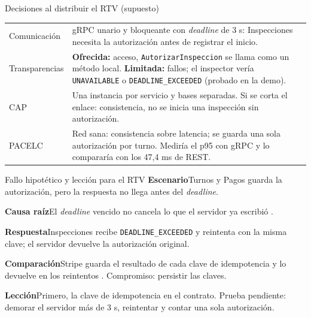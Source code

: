 \begin{frame}{Decisiones al distribuir el RTV (supuesto)}\relax
\small
\begin{tabularx}{\linewidth}{@{}lX@{}}
\toprule
Comunicación & gRPC unario y bloqueante con \emph{deadline} de 3 s: Inspecciones necesita la autorización antes de registrar el inicio.\\
Transparencias & \textbf{Ofrecida:} acceso, \texttt{AutorizarInspeccion} se llama como un método local. \textbf{Limitada:} fallos; el inspector vería \texttt{UNAVAILABLE} o \texttt{DEADLINE\_EXCEEDED} (probado en la demo).\\
CAP & Una instancia por servicio y bases separadas. Si se corta el enlace: consistencia, no se inicia una inspección sin autorización.\\
PACELC & Red sana: consistencia sobre latencia; se guarda una sola autorización por turno. Mediría el p95 con gRPC y lo compararía con los 47,4 ms de REST.\\
\bottomrule
\end{tabularx}
\end{frame}

\begin{frame}{Fallo hipotético y lección para el RTV}\relax
\small
\textbf{Escenario}\quad Turnos y Pagos guarda la autorización, pero la respuesta no llega antes del \emph{deadline}.\par\smallskip
\textbf{Causa raíz}\quad El \emph{deadline} vencido no cancela lo que el servidor ya escribió \cite{grpcdeadlines}.\par\smallskip
\textbf{Respuesta}\quad Inspecciones recibe \texttt{DEADLINE\_EXCEEDED} y reintenta con la misma clave; el servidor devuelve la autorización original.\par\smallskip
\textbf{Comparación}\quad Stripe guarda el resultado de cada clave de idempotencia y lo devuelve en los reintentos \cite{stripeidempotency}. Compromiso: persistir las claves.\par\smallskip
\textbf{Lección}\quad Primero, la clave de idempotencia en el contrato. Prueba pendiente: demorar el servidor más de 3 s, reintentar y contar una sola autorización.\par
\end{frame}